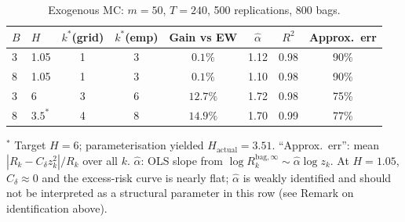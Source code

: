 \documentclass[12pt,a4paper]{article}
\theoremstyle{definition}
\begin{document}
\begin{table}[ht]
\centering
\caption{Exogenous MC: $m=50$, $T=240$, 500 replications, 800 bags.}
\label{tab:exo_main}
\begin{tabular}{llcccccc}
\toprule
$B$ & $H$ & $k^*$(grid) & $k^*$(emp) & Gain vs EW
    & $\hat\alpha$ & $R^2$ & Approx.\ err \\
\midrule
3 & 1.05 & 1 & 3 & $0.1\%$ & 1.12 & 0.98 & 90\% \\
8 & 1.05 & 1 & 3 & $0.1\%$ & 1.10 & 0.98 & 90\% \\
3 & 6    & 3 & 6 & $12.7\%$ & 1.72 & 0.98 & 75\% \\
8 & $3.5^*$ & 4 & 8 & $14.9\%$ & 1.70 & 0.99 & 77\% \\
\bottomrule
\end{tabular}
\footnotesize{$^*$ Target $H=6$; parameterisation yielded $H_{\mathrm{actual}}=3.51$.
``Approx.\ err'': mean $|R_k-C_\delta z_k^2|/R_k$ over all $k$.
$\hat\alpha$: OLS slope from $\log R_k^{\mathrm{bag},\infty}\sim\hat\alpha\log z_k$.
At $H=1.05$, $C_\delta\approx0$ and the excess-risk curve is nearly flat;
$\hat\alpha$ is weakly identified and should not be interpreted as a
structural parameter in this row (see Remark on identification above).}
\end{table}
\end{document}
